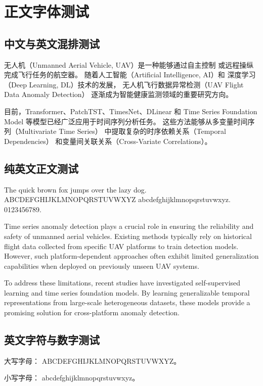 \chapter{正文字体测试}
\label{chap:font-test}

\section{中文与英文混排测试}

无人机（Unmanned Aerial Vehicle, UAV）是一种能够通过自主控制
或远程操纵完成飞行任务的航空器。
随着人工智能（Artificial Intelligence, AI）和
深度学习（Deep Learning, DL）技术的发展，
无人机飞行数据异常检测（UAV Flight Data Anomaly Detection）
逐渐成为智能健康监测领域的重要研究方向。

目前，Transformer、PatchTST、TimesNet、DLinear 和
Time Series Foundation Model 等模型已经广泛应用于时间序列分析任务。
这些方法能够从多变量时间序列（Multivariate Time Series）
中提取复杂的时序依赖关系（Temporal Dependencies）
和变量间关联关系（Cross-Variate Correlations）。

\section{纯英文正文测试}

The quick brown fox jumps over the lazy dog.
ABCDEFGHIJKLMNOPQRSTUVWXYZ abcdefghijklmnopqrstuvwxyz.
0123456789.

Time series anomaly detection plays a crucial role in ensuring
the reliability and safety of unmanned aerial vehicles.
Existing methods typically rely on historical flight data
collected from specific UAV platforms to train detection models.
However, such platform-dependent approaches often exhibit
limited generalization capabilities when deployed on previously
unseen UAV systems.

To address these limitations, recent studies have investigated
self-supervised learning and time series foundation models.
By learning generalizable temporal representations from
large-scale heterogeneous datasets, these models provide
a promising solution for cross-platform anomaly detection.

\section{英文字符与数字测试}

大写字母：
ABCDEFGHIJKLMNOPQRSTUVWXYZ。

小写字母：
abcdefghijklmnopqrstuvwxyz。

